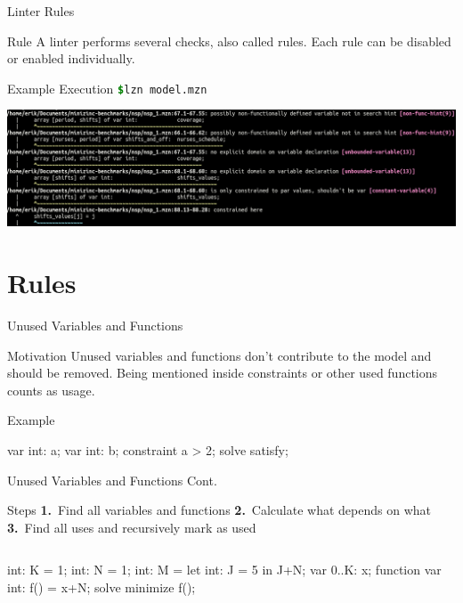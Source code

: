\documentclass[aspectratio=169]{beamer} %
\begin{document}
\begin{frame}{Linter Rules}
  \begin{block}{Rule}
    A linter performs several checks, also called rules.
    Each rule can be disabled or enabled individually.
  \end{block}
\end{frame}

\begin{frame}{Example Execution}
  \texttt{\textcolor{green}{\bfseries\$}\;lzn model.mzn}\bigskip

  \includegraphics[width=\textwidth]{lznexample.png}
\end{frame}

\section{Rules}

\begin{frame}[fragile]{Unused Variables and Functions}
  \begin{block}{Motivation}
    Unused variables and functions don't contribute to the model and should be removed.\pause{}
    Being mentioned inside constraints or other used functions counts as usage.
  \end{block}

  \pause
  \begin{exampleblock}{Example}
  \begin{mznno}
var int: a;
var int: b; %
constraint a > 2;
solve satisfy;
  \end{mznno}
  \end{exampleblock}
\end{frame}

\begin{frame}[fragile]{Unused Variables and Functions Cont.}
  \begin{block}{Steps}
    \textbf{1.}~Find all variables and functions\quad
    \textbf{2.}~Calculate what depends on what\quad
    \textbf{3.}~Find all uses and recursively mark as used\quad
  \end{block}

  \pause
  \begin{columns}[onlytextwidth]
    \begin{mznno}
int: K = 1;
int: N = 1;
int: M = let {int: J = 5} in J+N;
var 0..K: x;
function var int: f() = x+N;
solve minimize f();
    \end{mznno}
    \pause
    
  \end{columns}
\end{frame}
\end{document}
